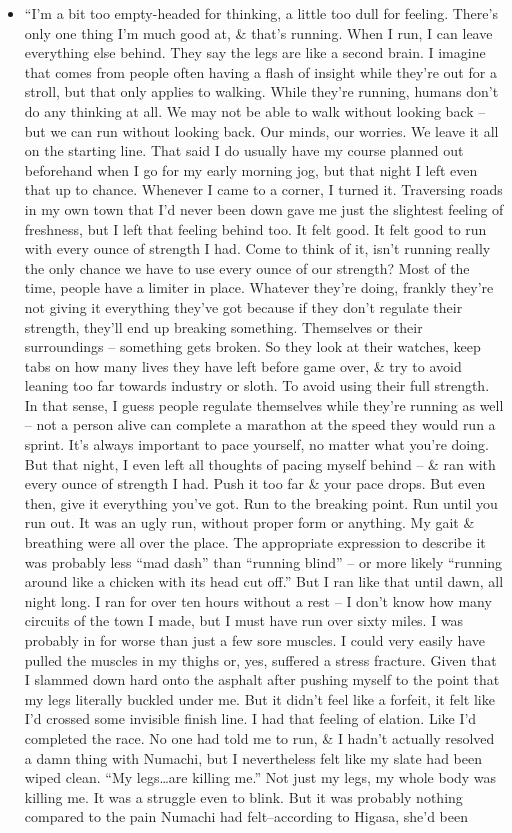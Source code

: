 \documentclass{article}
\begin{document}
\begin{enumerate}
\begin{itemize}
    	\item ``I'm a bit too empty-headed for thinking, a little too dull for feeling. There's only one thing I'm much good at, \& that's running. When I run, I can leave everything else behind. They say the legs are like a second brain. I imagine that comes from people often having a flash of insight while they're out for a stroll, but that only applies to walking. While they're running, humans don't do any thinking at all. We may not be able to walk without looking back -- but we can run without looking back. Our minds, our worries. We leave it all on the starting line. That said I do usually have my course planned out beforehand when I go for my early morning jog, but that night I left even that up to chance. Whenever I came to a corner, I turned it. Traversing roads in my own town that I'd never been down gave me just the slightest feeling of freshness, but I left that feeling behind too. It felt good. It felt good to run with every ounce of strength I had. Come to think of it, isn't running really the only chance we have to use every ounce of our strength? Most of the time, people have a limiter in place. Whatever they're doing, frankly they're not giving it everything they've got because if they don't regulate their strength, they'll end up breaking something. Themselves or their surroundings -- something gets broken. So they look at their watches, keep tabs on how many lives they have left before game over, \& try to avoid leaning too far towards industry or sloth. To avoid using their full strength. In that sense, I guess people regulate themselves while they're running as well -- not a person alive can complete a marathon at the speed they would run a sprint. It's always important to pace yourself, no matter what you're doing. But that night, I even left all thoughts of pacing myself behind -- \& ran with every ounce of strength I had. Push it too far \& your pace drops. But even then, give it everything you've got. Run to the breaking point. Run until you run out. It was an ugly run, without proper form or anything. My gait \& breathing were all over the place. The appropriate expression to describe it was probably less ``mad dash'' than ``running blind'' -- or more likely ``running around like a chicken with its head cut off.'' But I ran like that until dawn, all night long. I ran for over ten hours without a rest -- I don't know how many circuits of the town I made, but I must have run over sixty miles. I was probably in for worse than just a few sore muscles. I could very easily have pulled the muscles in my thighs or, yes, suffered a stress fracture. Given that I slammed down hard onto the asphalt after pushing myself to the point that my legs literally buckled under me. But it didn't feel like a forfeit, it felt like I'd crossed some invisible finish line. I had that feeling of elation. Like I'd completed the race. No one had told me to run, \& I hadn't actually resolved a damn thing with Numachi, but I nevertheless felt like my slate had been wiped clean. ``My legs…are killing me.'' Not just my legs, my whole body was killing me. It was a struggle even to blink. But it was probably nothing compared to the pain Numachi had felt--according to Higasa, she'd been 
\end{itemize}
\end{enumerate}
\end{document}
